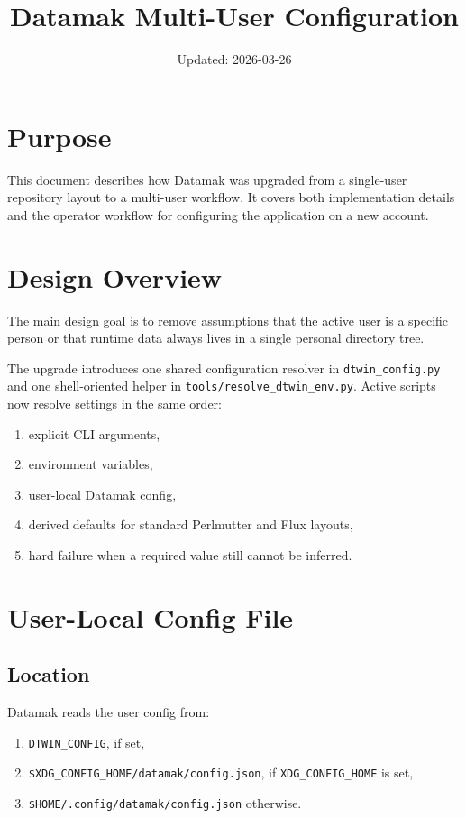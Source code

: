\documentclass[11pt]{article}
\title{Datamak Multi-User Configuration}
\author{}
\date{Updated: 2026-03-26}
\newcommand{\code}[1]{\texttt{#1}}
\begin{document}
\sloppy
\maketitle
\tableofcontents

\section{Purpose}

This document describes how Datamak was upgraded from a single-user repository
layout to a multi-user workflow. It covers both implementation details and the
operator workflow for configuring the application on a new account.

\section{Design Overview}

The main design goal is to remove assumptions that the active user is a
specific person or that runtime data always lives in a single personal
directory tree.

The upgrade introduces one shared configuration resolver in
\code{dtwin\_config.py} and one shell-oriented helper in
\code{tools/resolve\_dtwin\_env.py}. Active scripts now resolve settings in the
same order:

\begin{enumerate}
\item explicit CLI arguments,
\item environment variables,
\item user-local Datamak config,
\item derived defaults for standard Perlmutter and Flux layouts,
\item hard failure when a required value still cannot be inferred.
\end{enumerate}

\section{User-Local Config File}

\subsection{Location}

Datamak reads the user config from:

\begin{enumerate}
\item \code{DTWIN\_CONFIG}, if set,
\item \code{\$XDG\_CONFIG\_HOME/datamak/config.json}, if \code{XDG\_CONFIG\_HOME} is set,
\item \code{\$HOME/.config/datamak/config.json} otherwise.
\end{enumerate}
\end{document}
